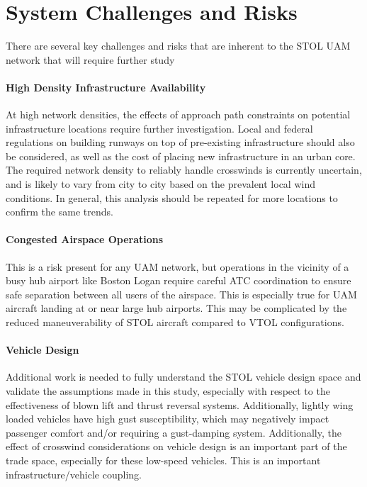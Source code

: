 \documentclass[]{aiaa-tc}%
\begin{document}
\section{System Challenges and Risks}
There are several key challenges and risks that are inherent to the STOL UAM network that will require further study
\paragraph{High Density Infrastructure Availability}
At high network densities, the effects of approach path constraints on potential infrastructure locations require further investigation.  Local and federal regulations on building runways on top of pre-existing infrastructure should also be considered, as well as the cost of placing new infrastructure in an urban core. The required network density to reliably handle crosswinds is currently uncertain, and is likely to vary from city to city based on the prevalent local wind conditions.  In general, this analysis should be repeated for more locations to confirm the same trends. 
\paragraph{Congested Airspace Operations}
This is a risk present for any UAM network, but operations in the vicinity of a busy hub airport like Boston Logan require careful ATC coordination to ensure safe separation between all users of the airspace.   This is especially true for UAM aircraft landing at or near large hub airports.  This may be complicated by the reduced maneuverability of STOL aircraft compared to VTOL configurations. 
\paragraph{Vehicle Design} 
Additional work is needed to fully understand the STOL vehicle design space and validate the assumptions made in this study, especially with respect to the effectiveness of blown lift and thrust reversal systems.  Additionally, lightly wing loaded vehicles have high gust susceptibility, which may negatively impact passenger comfort and/or requiring a gust-damping system.  Additionally, the effect of crosswind considerations on vehicle design is an important part of the trade space, especially for these low-speed vehicles.  This is an important infrastructure/vehicle coupling. 
\end{document}
